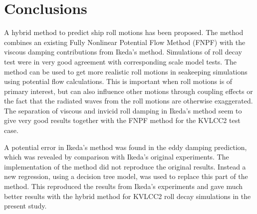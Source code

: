 \section{Conclusions}\label{conclusions}

A hybrid method to predict ship roll motions has been proposed. The
method combines an existing Fully Nonlinear Potential Flow Method (FNPF)
with the viscous damping contributions from Ikeda's method. Simulations
of roll decay test were in very good agreement with corresponding scale
model tests. The method can be used to get more realistic roll motions
in seakeeping simulations using potential flow calculations. This is
important when roll motions is of primary interest, but can also
influence other motions through coupling effects or the fact that the
radiated waves from the roll motions are otherwise exaggerated. The
separation of viscous and invicid roll damping in Ikeda's method seem to
give very good results together with the FNPF method for the KVLCC2 test
case.

A potential error in Ikeda's method was found in the eddy damping
prediction, which was revealed by comparison with Ikeda's original
experiments. The implementation of the method did not reproduce the
original results. Instead a new regression, using a decision tree model,
was used to replace this part of the method. This reproduced the results
from Ikeda's experiments and gave much better results with the hybrid
method for KVLCC2 roll decay simulations in the present study.

    